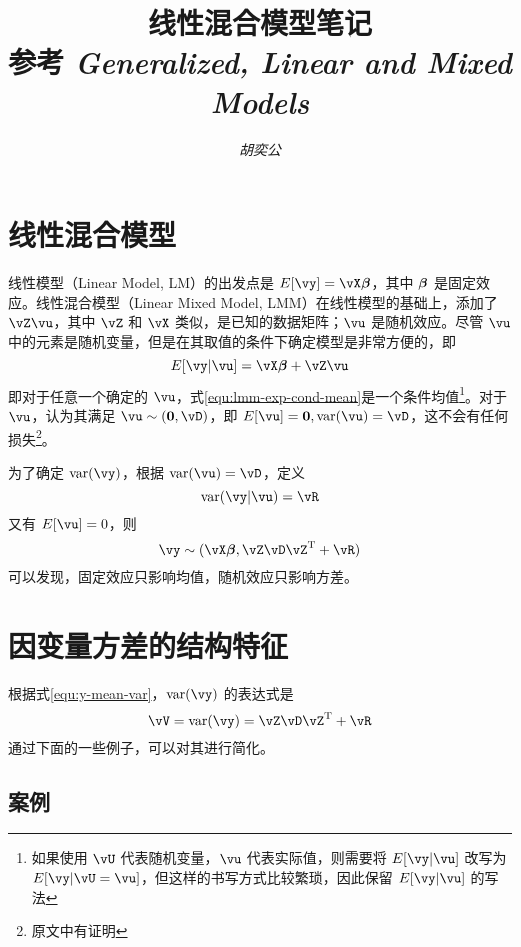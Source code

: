 \documentclass[UTF8]{ctexart}
\title{\textbf{线性混合模型笔记}\\\large 参考 \textit{Generalized, Linear and Mixed Models}}
\author{\textit{胡奕公}}
\date{}
\begin{document}
\maketitle
\tableofcontents

\section{线性混合模型}

线性模型（Linear Model, LM）的出发点是 $ E[\vy] = \vX\vbeta $，其中 $ \bm{\beta} $ 是固定效应。线性混合模型（Linear Mixed Model, LMM）在线性模型的基础上，添加了 $ \vZ\vu $，其中 $ \vZ $ 和 $ \vX $ 类似，是已知的数据矩阵；$ \vu $ 是随机效应。尽管 $ \vu $ 中的元素是随机变量，但是在其取值的条件下确定模型是非常方便的，即
\begin{equation}\label{equ:lmm-exp-cond-mean}
    E[\vy|\vu] = \vX\vbeta + \vZ\vu
\end{equation}
即对于任意一个确定的 $ \vu $，式\eqref{equ:lmm-exp-cond-mean}是一个条件均值\footnote{如果使用 $\vU$ 代表随机变量，$\vu$ 代表实际值，则需要将 $E[\vy|\vu]$ 改写为 $E[\vy|\vU=\vu]$，但这样的书写方式比较繁琐，因此保留 $E[\vy|\vu]$ 的写法}。对于 $ \vu $，认为其满足 $ \vu \sim (\vzero, \vD) $，即 $ E[\vu] = \vzero, \var(\vu) = \vD $，这不会有任何损失\footnote{原文中有证明}。

为了确定 $ \var(\vy) $，根据 $ \var(\vu) = \vD $，定义
\begin{equation}
    \var(\vy|\vu) = \vR
\end{equation}
又有 $ E[\vu] = 0 $，则
\begin{equation}\label{equ:y-mean-var}
    \vy \sim (\vX\vbeta, \vZ\vD\vZ\T+\vR)
\end{equation}
可以发现，固定效应只影响均值，随机效应只影响方差。

\section{因变量方差的结构特征}

根据式\eqref{equ:y-mean-var}，$ \var(\vy) $ 的表达式是
\begin{equation}
    \vV = \var(\vy) = \vZ\vD\vZ\T + \vR
\end{equation}
通过下面的一些例子，可以对其进行简化。

\subsection{案例}
\end{document}
